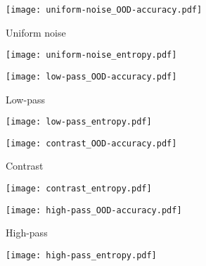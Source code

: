 \begin{figure}
		\begin{subfigure}{\figwidth}
			\centering
			\texttt{[image: uniform-noise\_OOD-accuracy.pdf]}
			\vspace{\captionspace}
			\caption{Uniform noise}
			\vspace{\captionspaceII}
		\end{subfigure}\hfill
		\begin{subfigure}{\figwidth}
			\centering
			\texttt{[image: uniform-noise\_entropy.pdf]}
			\vspace{\captionspace}
			\caption*{}
			\vspace{\captionspaceII}
		\end{subfigure}\hfill
		\begin{subfigure}{\figwidth}
			\centering
			\texttt{[image: low-pass\_OOD-accuracy.pdf]}
			\vspace{\captionspace}
			\caption{Low-pass}
			\vspace{\captionspaceII}
		\end{subfigure}\hfill
		\begin{subfigure}{\figwidth}
			\centering
			\texttt{[image: low-pass\_entropy.pdf]}
			\vspace{\captionspace}
			\caption*{}
			\vspace{\captionspaceII}
		\end{subfigure}\hfill
		
		\begin{subfigure}{\figwidth}
			\centering
			\texttt{[image: contrast\_OOD-accuracy.pdf]}
			\vspace{\captionspace}
			\caption{Contrast}
			\vspace{\captionspaceII}
		\end{subfigure}\hfill
		\begin{subfigure}{\figwidth}
			\centering
			\texttt{[image: contrast\_entropy.pdf]}
			\vspace{\captionspace}
			\caption*{}
			\vspace{\captionspaceII}
		\end{subfigure}\hfill
		\begin{subfigure}{\figwidth}
			\centering
			\texttt{[image: high-pass\_OOD-accuracy.pdf]}
			\vspace{\captionspace}
			\caption{High-pass}
			\vspace{\captionspaceII}
		\end{subfigure}\hfill
		\begin{subfigure}{\figwidth}
			\centering
			\texttt{[image: high-pass\_entropy.pdf]}
			\vspace{\captionspace}
			\caption*{}
			\vspace{\captionspaceII}
		\end{subfigure}\hfill
	

\end{figure}
